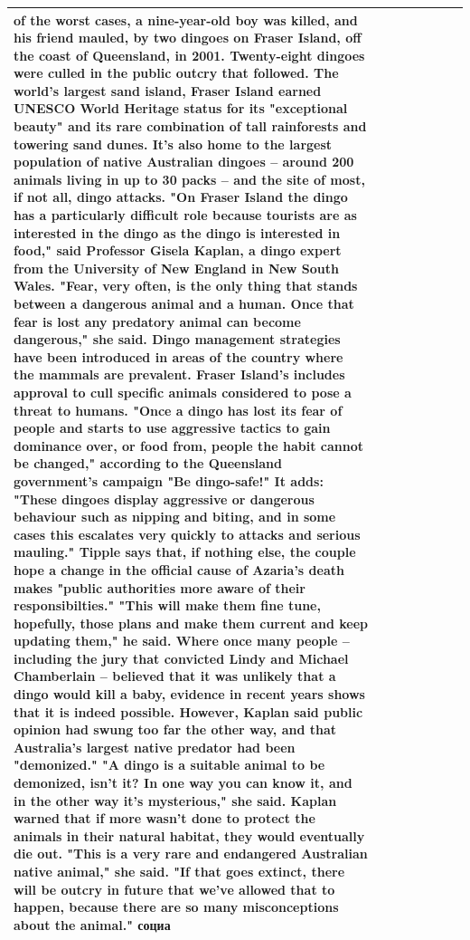 \begin{table}[H]
\begin{tabular}{llrlllll}
of the worst cases, a nine-year-old boy was killed, and his friend mauled, by two dingoes on Fraser Island, off the coast of Queensland, in 2001. Twenty-eight dingoes were culled in the public outcry that followed. The world's largest sand island, Fraser Island earned UNESCO World Heritage status for its "exceptional beauty" and its rare combination of tall rainforests and towering sand dunes. It's also home to the largest population of native Australian dingoes -- around 200 animals living in up to 30 packs -- and the site of most, if not all, dingo attacks. "On Fraser Island the dingo has a particularly difficult role because tourists are as interested in the dingo as the dingo is interested in food," said Professor Gisela Kaplan, a dingo expert from the University of New England in New South Wales. "Fear, very often, is the only thing that stands between a dangerous animal and a human. Once that fear is lost any predatory animal can become dangerous," she said. Dingo management strategies have been introduced in areas of the country where the mammals are prevalent. Fraser Island's includes approval to cull specific animals considered to pose a threat to humans. "Once a dingo has lost its fear of people and starts to use aggressive tactics to gain dominance over, or food from, people the habit cannot be changed," according to the Queensland government's campaign "Be dingo-safe!" It adds: "These dingoes display aggressive or dangerous behaviour such as nipping and biting, and in some cases this escalates very quickly to attacks and serious mauling." Tipple says that, if nothing else, the couple hope a change in the official cause of Azaria's death makes "public authorities more aware of their responsibilties." "This will make them fine tune, hopefully, those plans and make them current and keep updating them," he said. Where once many people -- including the jury that convicted Lindy and Michael Chamberlain -- believed that it was unlikely that a dingo would kill a baby, evidence in recent years shows that it is indeed possible. However, Kaplan said public opinion had swung too far the other way, and that Australia's largest native predator had been "demonized." "A dingo is a suitable animal to be demonized, isn't it? In one way you can know it, and in the other way it's mysterious," she said. Kaplan warned that if more wasn't done to protect the animals in their natural habitat, they would eventually die out. "This is a very rare and endangered Australian native animal," she said. "If that goes extinct, there will be outcry in future that we've allowed that to happen, because there are so many misconceptions about the animal." социа \\
\bottomrule
\end{tabular}
\end{table}
